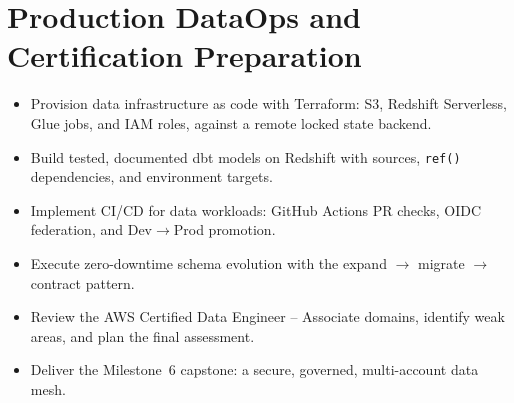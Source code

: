 \chapter{Production DataOps and Certification Preparation}
%
\begin{objectives}
\begin{itemize}
    \item Provision data infrastructure as code with Terraform: S3, Redshift Serverless, Glue jobs, and IAM roles, against a remote locked state backend.
    \item Build tested, documented dbt models on Redshift with sources, \texttt{ref()} dependencies, and environment targets.
    \item Implement CI/CD for data workloads: GitHub Actions PR checks, OIDC federation, and Dev$\rightarrow$Prod promotion.
    \item Execute zero-downtime schema evolution with the expand $\rightarrow$ migrate $\rightarrow$ contract pattern.
    \item Review the AWS Certified Data Engineer -- Associate domains, identify weak areas, and plan the final assessment.
    \item Deliver the Milestone~6 capstone: a secure, governed, multi-account data mesh.
\end{itemize}
\end{objectives}

